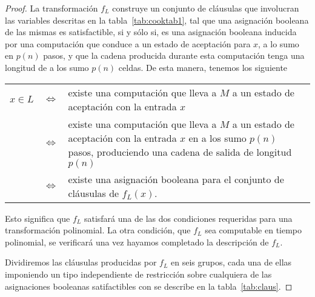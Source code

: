 \documentclass[11pt, a4paper]{memoir}
\begin{document}
\begin{proof}
La transformación $f_L$ construye un conjunto de cláusulas que involucran las variables descritas en la tabla~\ref{tab:cooktab1}, tal que una asignación booleana de las mismas es satisfactible, si y sólo si, es una asignación booleana inducida por una computación que conduce a un estado de aceptación para $x$,  a lo sumo en $p(n)$ pasos, y que la cadena producida durante esta computación tenga una longitud de a los sumo $p(n)$ celdas. De esta manera, tenemos los siguiente


	\begin{center}
		{\small
			\renewcommand{\arraystretch}{1.2}
			\begin{tabular}{@{}C{.10\textwidth}C{.10\textwidth}L{.65\textwidth}@{}}

$x \in L$        &    $\Longleftrightarrow$ & existe una computación que lleva a $M$ a un estado de aceptación con la entrada $x$ \\  
                 &    $\Longleftrightarrow$ & existe una computación que lleva a $M$ a un estado de aceptación con la entrada $x$ en a los sumo $p(n)$ pasos, produciendo una cadena de salida de longitud $p(n)$ \\
                 &    $\Longleftrightarrow$ & existe una asignación booleana para el conjunto de cláusulas de $f_L(x)$. \\
 			\end{tabular}
		}
	\end{center}

Esto significa que $f_L$ satisfará una de las dos condiciones requeridas para una transformación polinomial. La otra condición, que $f_L$ sea computable en tiempo polinomial, se verificará una vez hayamos completado la descripción de $f_L$. 

Dividiremos las cláusulas producidas por $f_L$ en seis grupos, cada una de ellas imponiendo un tipo independiente de restricción  sobre cualquiera de las asignaciones booleanas satifactibles con se describe en la tabla~\ref{tab:claus}.


\end{proof}
\end{document}
